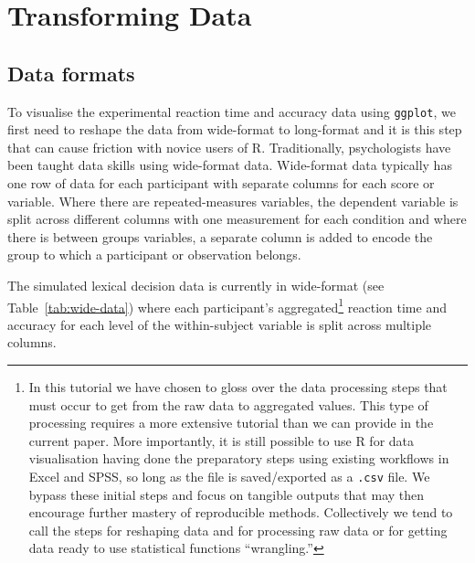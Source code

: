 \documentclass[
  english,
  doc,floatsintext]{apa6}
\begin{document}
\hypertarget{transforming-data}{%
\section{Transforming Data}\label{transforming-data}}

\hypertarget{data-formats}{%
\subsection{Data formats}\label{data-formats}}

To visualise the experimental reaction time and accuracy data using \texttt{ggplot}, we first need to reshape the data from wide-format to long-format and it is this step that can cause friction with novice users of R. Traditionally, psychologists have been taught data skills using wide-format data. Wide-format data typically has one row of data for each participant with separate columns for each score or variable. Where there are repeated-measures variables, the dependent variable is split across different columns with one measurement for each condition and where there is between groups variables, a separate column is added to encode the group to which a participant or observation belongs.

The simulated lexical decision data is currently in wide-format (see Table~\ref{tab:wide-data}) where each participant's aggregated\footnote{In this tutorial we have chosen to gloss over the data processing steps that must occur to get from the raw data to aggregated values. This type of processing requires a more extensive tutorial than we can provide in the current paper. More importantly, it is still possible to use R for data visualisation having done the preparatory steps using existing workflows in Excel and SPSS, so long as the file is saved/exported as a \texttt{.csv} file. We bypass these initial steps and focus on tangible outputs that may then encourage further mastery of reproducible methods. Collectively we tend to call the steps for reshaping data and for processing raw data or for getting data ready to use statistical functions ``wrangling.''} reaction time and accuracy for each level of the within-subject variable is split across multiple columns.
\end{document}
